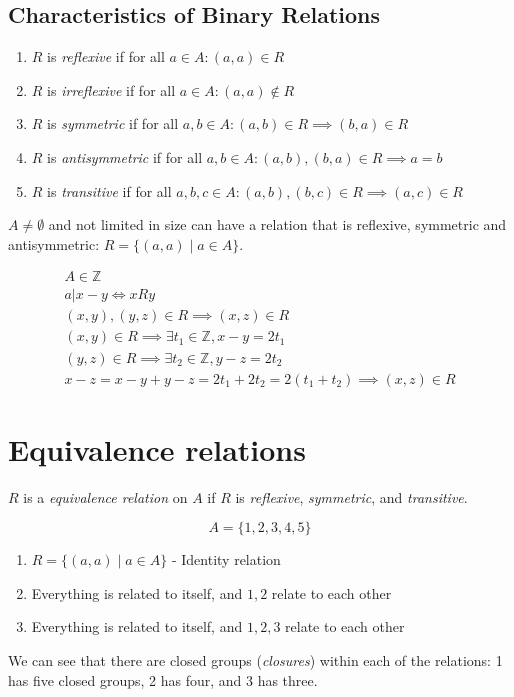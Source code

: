 \documentclass[00_complete]{subfiles}
\begin{document}
\subsection{Characteristics of Binary Relations}
\begin{enumerate}
    \item $R$ is \emph{reflexive} if for all $a \in A: (a,a) \in R$
    \item $R$ is \emph{irreflexive} if for all $a \in A: (a,a) \notin R$
    \item $R$ is \emph{symmetric} if for all $a,b \in A: (a,b) \in R \implies (b,a) \in R$
    \item $R$ is \emph{antisymmetric} if for all $a,b \in A: (a,b), (b,a) \in R \implies
   a=b$
    \item $R$ is \emph{transitive} if for all $a,b,c \in A: (a,b), (b,c) \in R \implies
   (a,c) \in R$
\end{enumerate}
$A \neq \emptyset$ and not limited in size can have a relation that is
reflexive, symmetric and antisymmetric: $R =\{(a,a) \mid a \in A \}$.
\begin{example}
$$
\begin{gathered}
    A \in \mathbb{Z} \\
    a|x-y \iff xRy \\
    (x,y), (y,z) \in R \implies (x,z) \in R \\
    (x,y) \in R \implies \exists t_1 \in \mathbb{Z}, x-y=2t_1 \\
    (y,z) \in R \implies \exists t_2 \in \mathbb{Z}, y-z=2t_2 \\
    x-z = x-y + y-z = 2t_1 + 2t_2 = 2(t_1 + t_2) \implies (x,z) \in R
\end{gathered}
$$
\end{example}
\section{Equivalence relations}
\begin{definition}
$R$ is a \emph{equivalence relation} on $A$ if $R$ is \emph{reflexive}, \emph{symmetric}, and
\emph{transitive}.
\end{definition}

\begin{example}
$$A = \{1,2,3,4,5\}$$
\begin{enumerate}
    \item $R = \{(a,a) \mid a \in A \}$ - Identity relation
    \item Everything is related to itself, and $1, 2$ relate to each other
    \item Everything is related to itself, and $1, 2, 3$ relate to each other
\end{enumerate}

We can see that there are closed groups (\emph{closures}) within each of the relations: 1 has
five closed groups, 2 has four, and 3 has three.
\end{example}
\end{document}
